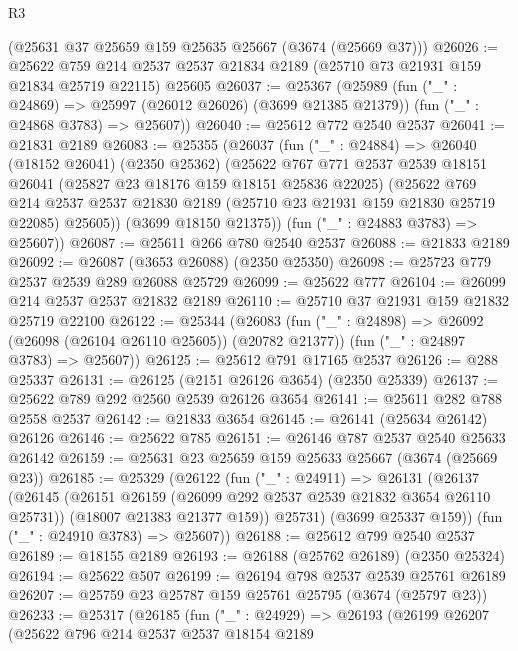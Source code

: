 \begin{lexlean}{R3}
\begin{coremodule}
    (@25631 @37 @25659 @159 @25635 @25667 (@3674 (@25669 @37)))
@26026 := @25622
    @759
    @214
    @2537
    @2537
    @21834
    @2189
    (@25710 @73 @21931 @159 @21834 @25719 @22115)
    @25605
@26037 := @25367
    (@25989
      (fun ("_" : @24869) => @25997 (@26012 @26026) (@3699 @21385 @21379))
      (fun ("_" : @24868 @3783) => @25607))
@26040 := @25612 @772 @2540 @2537
@26041 := @21831 @2189
@26083 := @25355
    (@26037
      (fun ("_" : @24884) =>
      @26040
        (@18152 @26041)
        (@2350 @25362)
        (@25622
          @767
          @771
          @2537
          @2539
          @18151
          @26041
          (@25827 @23 @18176 @159 @18151 @25836 @22025)
          (@25622
            @769
            @214
            @2537
            @2537
            @21830
            @2189
            (@25710 @23 @21931 @159 @21830 @25719 @22085)
            @25605))
        (@3699 @18150 @21375))
      (fun ("_" : @24883 @3783) => @25607))
@26087 := @25611 @266 @780 @2540 @2537
@26088 := @21833 @2189
@26092 := @26087 (@3653 @26088) (@2350 @25350)
@26098 := @25723 @779 @2537 @2539 @289 @26088 @25729
@26099 := @25622 @777
@26104 := @26099 @214 @2537 @2537 @21832 @2189
@26110 := @25710 @37 @21931 @159 @21832 @25719 @22100
@26122 := @25344
    (@26083
      (fun ("_" : @24898) => @26092 (@26098 (@26104 @26110 @25605)) (@20782 @21377))
      (fun ("_" : @24897 @3783) => @25607))
@26125 := @25612 @791 @17165 @2537
@26126 := @288 @25337
@26131 := @26125 (@2151 @26126 @3654) (@2350 @25339)
@26137 := @25622 @789 @292 @2560 @2539 @26126 @3654
@26141 := @25611 @282 @788 @2558 @2537
@26142 := @21833 @3654
@26145 := @26141 (@25634 @26142) @26126
@26146 := @25622 @785
@26151 := @26146 @787 @2537 @2540 @25633 @26142
@26159 := @25631 @23 @25659 @159 @25633 @25667 (@3674 (@25669 @23))
@26185 := @25329
    (@26122
      (fun ("_" : @24911) =>
      @26131
        (@26137
          (@26145
            (@26151 @26159 (@26099 @292 @2537 @2539 @21832 @3654 @26110 @25731))
            (@18007 @21383 @21377 @159))
          @25731)
        (@3699 @25337 @159))
      (fun ("_" : @24910 @3783) => @25607))
@26188 := @25612 @799 @2540 @2537
@26189 := @18155 @2189
@26193 := @26188 (@25762 @26189) (@2350 @25324)
@26194 := @25622 @507
@26199 := @26194 @798 @2537 @2539 @25761 @26189
@26207 := @25759 @23 @25787 @159 @25761 @25795 (@3674 (@25797 @23))
@26233 := @25317
    (@26185
      (fun ("_" : @24929) =>
      @26193
        (@26199
          @26207
          (@25622
            @796
            @214
            @2537
            @2537
            @18154
            @2189

\end{coremodule}
\end{lexlean}
